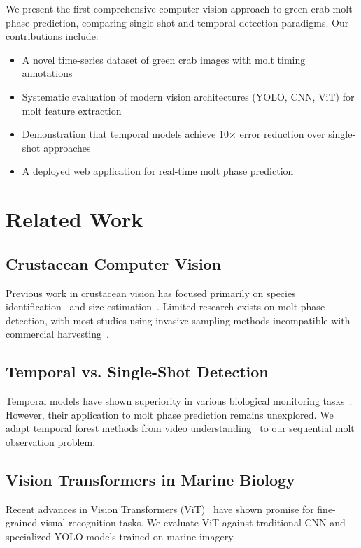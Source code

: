 \documentclass[10pt,twocolumn,letterpaper]{article}
\begin{document}
We present the first comprehensive computer vision approach to green crab molt phase prediction, comparing single-shot and temporal detection paradigms. Our contributions include:

\begin{itemize}
\item A novel time-series dataset of green crab images with molt timing annotations
\item Systematic evaluation of modern vision architectures (YOLO, CNN, ViT) for molt feature extraction
\item Demonstration that temporal models achieve 10× error reduction over single-shot approaches
\item A deployed web application for real-time molt phase prediction
\end{itemize}

\section{Related Work}

\subsection{Crustacean Computer Vision}
Previous work in crustacean vision has focused primarily on species identification~\cite{species2019} and size estimation~\cite{size2020}. Limited research exists on molt phase detection, with most studies using invasive sampling methods incompatible with commercial harvesting~\cite{molt2018}.

\subsection{Temporal vs. Single-Shot Detection}
Temporal models have shown superiority in various biological monitoring tasks~\cite{temporal2021}. However, their application to molt phase prediction remains unexplored. We adapt temporal forest methods from video understanding~\cite{video2022} to our sequential molt observation problem.

\subsection{Vision Transformers in Marine Biology}
Recent advances in Vision Transformers (ViT)~\cite{vit2021} have shown promise for fine-grained visual recognition tasks. We evaluate ViT against traditional CNN and specialized YOLO models trained on marine imagery.
\end{document}
